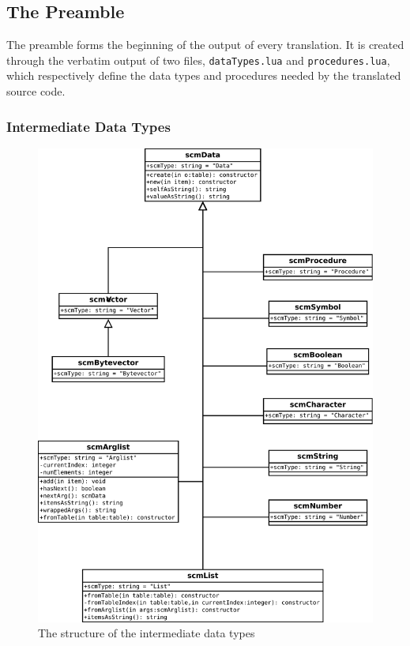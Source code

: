 \subsection{The Preamble}

The preamble forms the beginning of the output of every translation. It is
created through the verbatim output of two files, \texttt{dataTypes.lua} and
\texttt{procedures.lua}, which respectively define the data types and procedures
needed by the translated source code.

\subsubsection{Intermediate Data Types}

\begin{figure}
\centering
\includegraphics[width=\textwidth]{scmDataUML.pdf}
\caption{The structure of the intermediate data types}
\label{fig:scmDataUML}
\end{figure}

